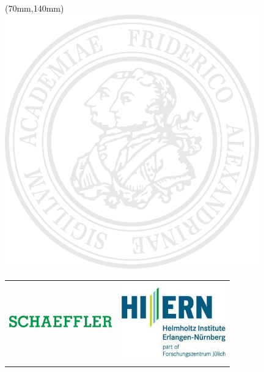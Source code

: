 \thispagestyle{empty}
\begin{addmargin}[-1cm]{-3cm}
\begin{center}

    \begin{textblock*}{14cm}(70mm,140mm)
	    \includegraphics[width=110mm]{gfx/essential/fausiegel.pdf}
	\end{textblock*}   

    \vspace{-1cm}
    \begin{tabularx}{15cm}{X r}
        \includegraphics[width=4.5cm]{gfx/essential/schaeffler.png} & \multicolumn{1}{m{4.5cm}}{\includegraphics[width=4.5cm]{gfx/essential/HIERN.jpg}}
    \end{tabularx}

    \vfill
    \begin{minipage}{12cm}
        \begin{center}
            \large \color{\primarycolor}\spacedallcaps{\myTitleTitlepage}
        \end{center}
    \end{minipage}
    \vspace{1cm}


\end{center}
\end{addmargin}
